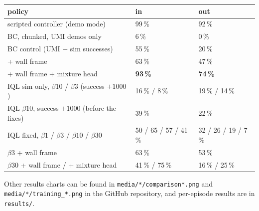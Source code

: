 \documentclass[10pt]{article}
\newcommand{\pct}{\,\%}
\begin{document}
\begin{center}
\begin{tabular}{lll}
\toprule
policy & in & out \\
\midrule
scripted controller (demo mode) & 99\pct{}  & 92\pct{}  \\
BC, chunked, UMI demos only & 6\pct{}  & 0\pct{} \\
BC control (UMI + sim successes) & 55\pct{} & 20\pct{} \\
\quad + wall frame & 63\pct{} & 47\pct{} \\
\quad + wall frame + mixture head & \textbf{93\pct{}} & \textbf{74\pct{}} \\
IQL sim only, $\beta 10$ / $\beta 3$ (success $+1000$) & 16\pct{} / 8\pct & 19\pct{} / 14\pct \\
IQL $\beta 10$, success $+1000$ (before the fixes) & 39\pct{} & 22\pct{} \\
IQL fixed, $\beta 1$ / $\beta 3$ / $\beta 10$ / $\beta 30$ & 50 / 65 / 57 / 41\pct & 32 / 26 / 19 / 7\pct \\
\quad $\beta 3$ + wall frame & 63\pct{} & 53\pct{} \\
\quad $\beta 30$ + wall frame / + mixture head & 41\pct{} / 75\pct & 16\pct{} / 25\pct \\
\bottomrule
\end{tabular}
\end{center}

Other results charts can be found in \texttt{media/*/comparison*.png} and \texttt{media/*/training\_*.png} in the GitHub repository, and per-episode results are in \texttt{results/}.
\end{document}
